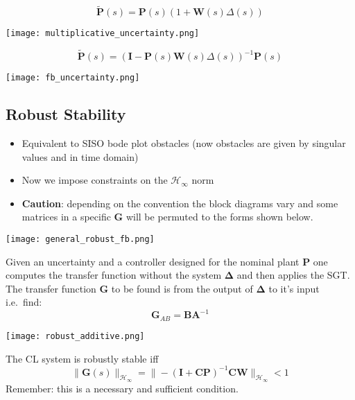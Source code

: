 \begin{equation*}
    \tilde{\mathbf{P}}(s)=\mathbf{P}(s)(1+\mathbf{W}(s)\Delta(s))
\end{equation*}
\begin{center}
    \texttt{[image: multiplicative\_uncertainty.png]}
\end{center}
\begin{equation*}
    \tilde{\mathbf{P}}(s)={(\mathbf{I}-\mathbf{P}(s)\mathbf{W}(s)\Delta(s))}^{-1}\mathbf{P}(s)
\end{equation*}
\begin{center}
    \texttt{[image: fb\_uncertainty.png]}
\end{center}

\subsection{Robust Stability}
\begin{itemize}
    \item Equivalent to SISO bode plot obstacles (now obstacles are given by singular values and in time domain)
    \item Now we impose constraints on the $\mathcal{H}_{\infty}$ norm
    \item \textbf{Caution}: depending on the convention the block diagrams vary and some matrices in a specific $\mathbf{G}$ will be permuted to the forms shown below.
\end{itemize}


\begin{center}
    \texttt{[image: general\_robust\_fb.png]}
\end{center}
Given an uncertainty and a controller designed for the nominal plant $\mathbf{P}$ one computes the transfer function without the system $\boldsymbol{\Delta}$ and then applies the SGT. The transfer function $\mathbf{G}$ to be found is from the output of $\boldsymbol{\Delta}$ to it's input i.e.\ find:
\begin{equation*}
    \mathbf{G}_{AB}=\mathbf{BA}^{-1}
\end{equation*}

\begin{center}
    \texttt{[image: robust\_additive.png]}
\end{center}
The CL system is robustly stable iff
\begin{equation*}
    \|\mathbf{G}(s)\|_{\mathcal{H}_\infty}=\|-{(\mathbf{I}+\mathbf{C}\mathbf{P})}^{-1}\mathbf{C}\mathbf{W}\|_{\mathcal{H}_\infty}<1
\end{equation*}
Remember: this is a necessary and sufficient condition.

